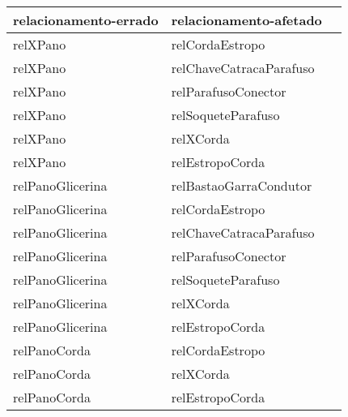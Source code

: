 \begin{table}[H]
\centering
{}
\begin{tabular}{|l|l|l|}
\hline
\textbf{relacionamento-errado}                  & \textbf{relacionamento-afetado}                  \\ \hline
relXPano                                        & relCordaEstropo                                  \\ \hline
relXPano                                        & relChaveCatracaParafuso                          \\ \hline
relXPano                                        & relParafusoConector                              \\ \hline
relXPano                                        & relSoqueteParafuso                               \\ \hline
relXPano                                        & relXCorda                                        \\ \hline
relXPano                                        & relEstropoCorda                                  \\ \hline
relPanoGlicerina                                & relBastaoGarraCondutor                           \\ \hline
relPanoGlicerina                                & relCordaEstropo                                  \\ \hline
relPanoGlicerina                                & relChaveCatracaParafuso                          \\ \hline
relPanoGlicerina                                & relParafusoConector                              \\ \hline
relPanoGlicerina                                & relSoqueteParafuso                               \\ \hline
relPanoGlicerina                                & relXCorda                                        \\ \hline
relPanoGlicerina                                & relEstropoCorda                                  \\ \hline
relPanoCorda                                    & relCordaEstropo                                  \\ \hline
relPanoCorda                                    & relXCorda                                        \\ \hline
relPanoCorda                                    & relEstropoCorda                                  \\ \hline

\end{tabular}
\end{table}
